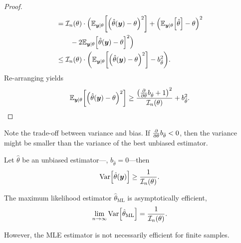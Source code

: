 \begin{proof}
\begin{align*}
                                                                                                        & = \mathcal{I}_n(\theta) \cdot \Big( \E_{\vec{y} \mid \theta}\lft[ \lft( \hat{\theta}(\vec{y}) - \theta \rgt)^2 \rgt] + \lft( \E_{\vec{y} \mid \theta}\lft[ \hat{\theta} \rgt] - \theta \rgt)^2 \\
                                                                                                        & \quad \quad - 2 \E_{\vec{y}\mid \theta} \lft[ \hat{\theta}(\vec{y}) - \theta \rgt]^2 \Big)                                                                                                     \\
                                                                                                        & \leq \mathcal{I}_n(\theta) \cdot \lft( \E_{\vec{y} \mid \theta} \lft[ \lft( \hat{\theta}(\vec{y}) - \theta \rgt)^2 \rgt] - b_{\hat{\theta}}^2 \rgt).
    \end{align*}
    Re-arranging yields \[
        \E_{\vec{y} \mid \theta} \lft[ \lft( \hat{\theta}(\vec{y}) - \theta \rgt)^2 \rgt] \geq \frac{\lft( \pdv*{b_{\hat{\theta}}}{\theta} + 1 \rgt)^2}{\mathcal{I}_n(\theta)} + b_{\hat{\theta}}^2.
    \]
\end{proof}

Note the trade-off between variance and bias. If $\pdv*{b_{\hat{\theta}}}{\theta} < 0$, then the
variance might be smaller than the variance of the best unbiased estimator.

\begin{corollary}
    Let $\hat{\theta}$ be an unbiased estimator---\ie, $b_{\hat{\theta}} = 0$---then \[
        \Var \lft[ \hat{\theta}(\vec{y}) \rgt] \geq \frac{1}{\mathcal{I}_n(\theta)}.
    \]
\end{corollary}

\begin{lemma}
    The maximum likelihood estimator $\hat{\theta}_{\mathrm{ML}}$ is asymptotically efficient, \[
        \lim_{n\to \infty} \Var \lft[ \hat{\theta}_{\mathrm{ML}} \rgt] = \frac{1}{\mathcal{I}_n(\theta)}.
    \]
\end{lemma}

However, the MLE estimator is not necessarily efficient for finite samples.
